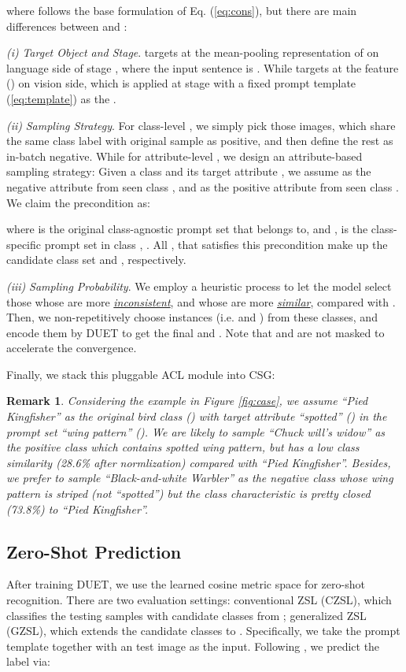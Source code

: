 \documentclass[letterpaper]{article} \usepackage{aaai23}  \usepackage{times}  \usepackage{helvet}  \usepackage{courier}  \usepackage[hyphens]{url}  \usepackage{graphicx} \urlstyle{rm} \def\UrlFont{\rm}  \usepackage{natbib}  \usepackage{caption} \frenchspacing  \setlength{\pdfpagewidth}{8.5in}  \setlength{\pdfpageheight}{11in}  \usepackage{algorithm}
\newtheorem{remark}{\noindent \textbf{Remark}}
\newcommand{\fy}[1]{{\color{black}#1}}
\begin{document}
where  follows the base formulation of Eq. (\ref{eq:cons}),  but there are  main differences between  and :

\textit{(i)} \textit{Target Object and Stage}.  targets at the mean-pooling representation of   on language side of stage , where the input sentence  is .
While  targets at the feature () on vision side, which is applied at stage  with a fixed prompt template (\ref{eq:template}) as the .

\textit{(ii)} \textit{Sampling Strategy}. 
For class-level , we simply pick those images, which share the same class label with original sample as positive,  and then define the rest as in-batch negative.
While for attribute-level , we design {an}
attribute-based sampling strategy:
Given a class  and its target attribute , we assume  as the negative attribute from seen class , and  as the positive attribute from seen class . 
We claim the precondition as:

where  is the original {{class-agnostic}} prompt set that  belongs to, and ,  is the {{class-specific}} prompt set in class , .
All ,  that satisfies this precondition make up the candidate class set  and , respectively.

\textit{(iii)} \textit{Sampling Probability}. 
We employ a heuristic process to let the model 
select those  whose  are more \ul{\emph{inconsistent}}, and   whose  are more \ul{\emph{similar}}, compared with . 
Then, we non-repetitively choose instances (i.e.  and ) from these classes, {and} encode them by DUET to get the final  and .
{Note that}  and  {are not} masked to accelerate the convergence. 

Finally, we stack this pluggable ACL module into CSG:

\begin{remark}
\vspace{-7pt}
{Considering the example in Figure \ref{fig:case},} we assume ``Pied Kingfisher'' as the original bird class () with  target attribute ``spotted'' () in {the} prompt set ``wing pattern'' ().  
We are likely to sample  ``Chuck will's widow'' as the positive class  which {contains} spotted wing pattern, but has a low class similarity (28.6\% after normlization) compared with ``Pied Kingfisher''. Besides, we prefer to sample ``Black-and-white Warbler'' as the negative class  whose wing pattern is striped ({not} ``spotted'') but the class characteristic is pretty closed (73.8\%) to ``Pied Kingfisher''.
\end{remark}


\subsection{Zero-Shot Prediction}\label{sec:ZSP}
After training DUET, we use the learned cosine metric space for zero-shot recognition.
There are two evaluation settings: \fy{conventional ZSL (CZSL), which classifies the testing samples with candidate classes from ;
generalized ZSL (GZSL), which} 
extends the candidate classes to . 
Specifically, we take the prompt template  
together with an test image  as the input.
Following \cite{DBLP:conf/cvpr/Liu00H00H21,Chen2022MSDN}, we 
predict the label  via:
\end{document}
